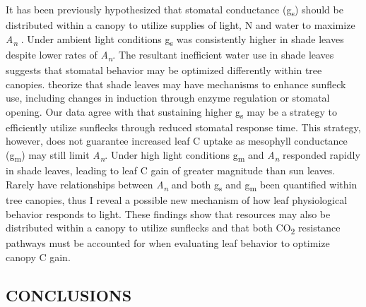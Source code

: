 \documentclass[a4paper]{article}
\begin{document}
It has been previously hypothesized that stomatal conductance (g\textsubscript{s}) should be distributed within a canopy to utilize supplies of light, N and water to maximize \textit{A\textsubscript{n}} \citep{peltoniemi2012co}. Under ambient light conditions g\textsubscript{s} was consistently higher in shade leaves despite lower rates of \textit{A\textsubscript{n}}. The resultant inefficient water use in shade leaves suggests that stomatal behavior may be optimized differently within tree canopies. \citet{pearcy2012two} theorize that shade leaves may have mechanisms to enhance sunfleck use, including changes in induction through enzyme regulation or stomatal opening. Our data agree with \citet{tausz2005dynamic} that sustaining higher g\textsubscript{s} may be a strategy to efficiently utilize sunflecks through reduced stomatal response time. This strategy, however, does not guarantee increased leaf C uptake as mesophyll conductance (g\textsubscript{m}) may still limit \textit{A\textsubscript{n}}. Under high light conditions g\textsubscript{m} and \textit{A\textsubscript{n}} responded rapidly in shade leaves, leading to leaf C gain of greater magnitude than sun leaves. Rarely have relationships between \textit{A\textsubscript{n}} and both g\textsubscript{s} and g\textsubscript{m} been quantified within tree canopies, thus I reveal a possible new mechanism of how leaf physiological behavior responds to light. These findings show that resources may also be distributed within a canopy to utilize sunflecks and that both CO\textsubscript{2} resistance pathways must be accounted for when evaluating leaf behavior to optimize canopy C gain.

\subsection*{CONCLUSIONS}
\end{document}
